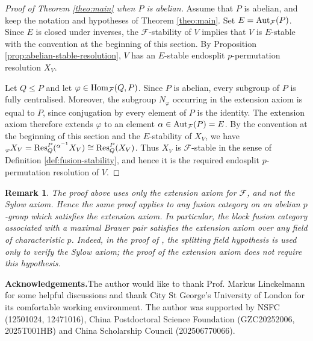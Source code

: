 \documentclass[preprint,12pt,3p]{elsarticle}
\newtheorem{remark}[theorem]{Remark}%
\def\Res{{\rm Res}}
\def\Aut{{\rm Aut}}
\def\Hom{{\rm Hom}}
\def\F{\mathcal{F}}
\begin{document}
\begin{proof}[Proof of Theorem \ref{theo:main} when $P$ is abelian]
Assume that $P$ is abelian, and keep the notation and hypotheses of Theorem \ref{theo:main}. Set $E=\Aut_\F(P)$. Since $E$ is closed under inverses, the $\F$-stability of $V$ implies that $V$ is $E$-stable with the convention at the beginning of this section. By Proposition \ref{prop:abelian-stable-resolution}, $V$ has an $E$-stable endosplit $p$-permutation resolution $X_V$.

Let $Q\leq P$ and let $\varphi\in\Hom_\F(Q,P)$. Since $P$ is abelian, every subgroup of $P$ is fully centralised. Moreover, the subgroup $N_\varphi$ occurring in the extension axiom is equal to $P$, since conjugation by every element of $P$ is the identity. The extension axiom therefore extends $\varphi$ to an element $\alpha\in\Aut_\F(P)=E$. By the convention at the beginning of this section and the $E$-stability of $X_V$, we have ${}_\varphi X_V=\Res_Q^P({}^{\alpha^{-1}}X_V)\cong\Res_Q^P(X_V)$. Thus $X_V$ is $\F$-stable in the sense of Definition \ref{def:fusion-stability}, and hence it is the required endosplit $p$-permutation resolution of $V$.
\end{proof}

\begin{remark}
{\rm The proof above uses only the extension axiom for $\F$, and not the Sylow axiom. Hence the same proof applies to any fusion category on an abelian $p$-group which satisfies the extension axiom. In particular, the block fusion category associated with a maximal Brauer pair satisfies the extension axiom over any field of characteristic $p$. Indeed, in the proof of \cite[Theorem 8.5.2]{Lin18b}, the splitting field hypothesis is used only to verify the Sylow axiom; the proof of the extension axiom does not require this hypothesis. }
\end{remark}

\bigskip\noindent\textbf{Acknowledgements.}\quad The author would like to thank Prof. Markus Linckelmann for some helpful discussions and thank City St George's University of London for its comfortable working environment. The author was supported by NSFC (12501024, 12471016), China Postdoctoral Science Foundation (GZC20252006, 2025T001HB) and China Scholarship Council (202506770066).
\end{document}

